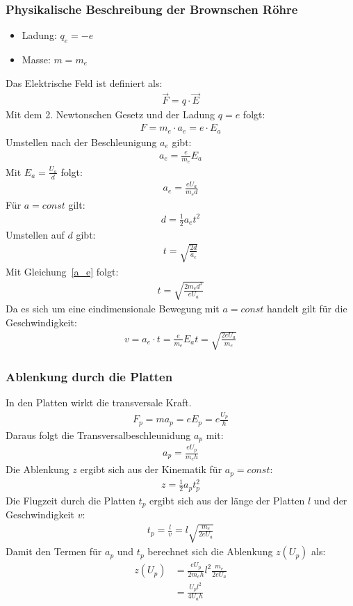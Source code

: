 \documentclass{article}
\begin{document}
\subsubsection*{Physikalische Beschreibung der Brownschen Röhre}
\begin{itemize}
\item Ladung: $q_e=-e$
\item Masse: $m=m_e$
\end{itemize}
Das Elektrische Feld ist definiert als:
\begin{align}
    \vec{F}=q\cdot \vec{E}
\end{align}
Mit dem 2. Newtonschen Gesetz und der Ladung $q=e$ folgt:
\begin{align}
    F=m_e\cdot a_e=e\cdot E_a
\end{align}
Umstellen nach der Beschleunigung $a_e$ gibt:
\begin{align}
    a_e=\frac{e}{m_e}E_a
\end{align}
Mit $E_a=\frac{U_a}{d}$ folgt:
\begin{align}
    a_e=\frac{eU_a}{m_ed}\label{a_e}
\end{align}
Für $a=const$ gilt:
\begin{align}
    d=\frac{1}{2}a_et^2
\end{align}
Umstellen auf $d$ gibt:
\begin{align}
    t=\sqrt{\frac{2d}{a_e}}
\end{align}
Mit Gleichung~\ref{a_e} folgt:
\begin{align}
    t=\sqrt{\frac{2m_ed^2}{eU_a}}\label{t_e}
\end{align}
Da es sich um eine eindimensionale Bewegung mit $a=const$ handelt gilt für die Geschwindigkeit:
\begin{align}
    v=a_e\cdot t=\frac{e}{m_e}E_at=\sqrt{\frac{2eU_a}{m_e}}
\end{align}

\subsubsection*{Ablenkung durch die Platten}
In den Platten wirkt die transversale Kraft.
\begin{align}
    F_p=ma_p=eE_p=e\frac{U_p}{h}
\end{align}
Daraus folgt die Transversalbeschleunidung $a_p$ mit:
\begin{align}
    a_p=\frac{eU_p}{m_eh}
\end{align}
Die Ablenkung $z$ ergibt sich aus der Kinematik für $a_p=const$:
\begin{align}
    z=\frac{1}{2}a_pt_p^2
\end{align}
Die Flugzeit durch die Platten $t_p$ ergibt sich aus der länge der Platten $l$ und der Geschwindigkeit $v$:
\begin{align}
    t_p=\frac{l}{v}=l\sqrt{\frac{m_e}{2eU_a}}
\end{align}
Damit den Termen für $a_p$ und $t_p$ berechnet sich die Ablenkung $z(U_p)$ als:
\begin{align}
    z(U_p)&=\frac{eU_p}{2m_eh}l^2\frac{m_e}{2eU_a}\\
    &=\frac{U_pl^2}{4U_ah}
\end{align}
\end{document}
